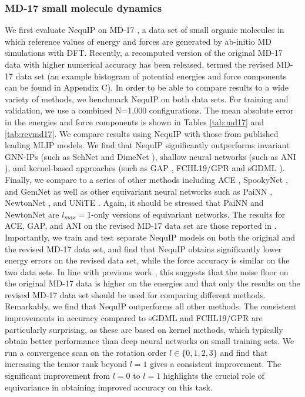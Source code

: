 \documentclass[%
reprint,
superscriptaddress,
nofootinbib,
amsmath,amssymb,
aps,
prl,
]{revtex4-1}
\begin{document}
\subsubsection{MD-17 small molecule dynamics}
We first evaluate NequIP on MD-17 \cite{chmiela2017machine, schutt2017quantum, sgdml}, a data set of small organic molecules in which reference values of energy and forces are generated by ab-initio MD simulations with DFT. Recently, a recomputed version of the original MD-17 data with higher numerical accuracy has been released, termed the revised MD-17 data set \cite{christensen2020role} (an example histogram of potential energies and force components can be found in Appendix C). In order to be able to compare results to a wide variety of methods, we benchmark NequIP on both data sets. For training and validation, we use a combined N=1,000 configurations. The mean absolute error in the energies and force components is shown in Tables \ref{tab:md17} and \ref{tab:revmd17}. We compare results using NequIP with those from published leading MLIP models. We find that NequIP significantly outperforms invariant GNN-IPs (such as SchNet \cite{schnet_neurips} and DimeNet \cite{klicpera2020directional}), shallow neural networks (such as ANI \cite{devereux2020extending}), and kernel-based approaches (such as GAP \cite{gaporiginalpaper}, FCHL19/GPR \cite{christensen2020fchl, christensen2020role} and sGDML \cite{sgdml}). Finally, we compare to a series of other methods including ACE \cite{drautz2019atomic}, SpookyNet \cite{unke2021}, and GemNet \cite{klicpera2021gemnet} as well as other equivariant neural networks such as PaiNN \cite{schutt2021equivariant}, NewtonNet \cite{haghighatlari2021newtonnet}, and UNiTE \cite{qiao2021unite}. Again, it should be stressed that PaiNN and NewtonNet are $l_{max}=1$-only versions of equivariant networks. The results for ACE, GAP, and ANI on the revised MD-17 data set are those reported in \cite{kovacs2021linear}. Importantly, we train and test separate NequIP models on both the original and the revised MD-17 data set, and find that NequIP obtains significantly lower energy errors on the revised data set, while the force accuracy is similar on the two data sets. In line with previous work \cite{christensen2020role}, this suggests that the noise floor on the original MD-17 data is higher on the energies and that only the results on the revised MD-17 data set should be used for comparing different methods.\\

Remarkably, we find that NequIP outperforms all other methods. The consistent improvements in accuracy compared to sGDML and FCHL19/GPR are particularly surprising, as these are based on kernel methods, which typically obtain better performance than deep neural networks on small training sets. We run a convergence scan on the rotation order $l \in \{0, 1, 2, 3\}$ and find that increasing the tensor rank beyond $l=1$ gives a consistent improvement. The significant improvement from $l=0$ to $l=1$ highlights the crucial role of equivariance in obtaining improved accuracy on this task. 
\end{document}

